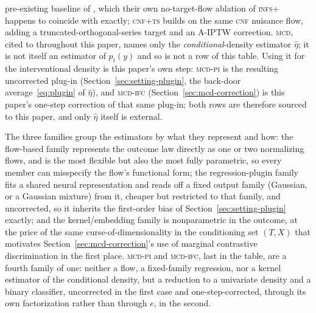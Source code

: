 \documentclass[11pt]{article}
\theoremstyle{plain}
\theoremstyle{definition}
\theoremstyle{remark}
\newcommand{\gps}{e}
\begin{document}
\begin{table}[htbp]
{pre-existing baseline of \citet{trippe2018cnf}, which their own no-target-flow ablation of
\textsc{infs+} happens to coincide with exactly; \textsc{cnf+ts} \citep{kennedy2023density}
builds on the same \textsc{cnf} nuisance flow, adding a truncated-orthogonal-series target and
an A-IPTW correction. \textsc{mcd}, cited to \citet{meziani2025mcd} throughout this paper,
names only the \emph{conditional}-density estimator $\widehat\eta$; it is not itself an
estimator of $p_t(y)$ and so is not a row of this table. Using it for the interventional
density is this paper's own step: \textsc{mcd-pi} is the resulting uncorrected plug-in
(Section~\ref{sec:setting-plugin}, the back-door average~\eqref{eq:plugin} of $\widehat\eta$),
and \textsc{mcd-ifc} (Section~\ref{sec:mcd-correction}) is this paper's one-step correction of
that same plug-in; both rows are therefore sourced to this paper, and only $\widehat\eta$
itself is external.}
\label{tab:glossary}
\end{table}

The three families group the estimators by what they represent and how: the flow-based family
represents the outcome law directly as one or two normalizing flows, and is the most flexible
but also the most fully parametric, so every member can misspecify the flow's functional form;
the regression-plugin family fits a shared neural representation and reads off a fixed output
family (Gaussian, or a Gaussian mixture) from it, cheaper but restricted to that family, and
uncorrected, so it inherits the first-order bias of Section~\ref{sec:setting-plugin} exactly;
and the kernel/embedding family is nonparametric in the outcome, at the price of the same
curse-of-dimensionality in the conditioning set $(T,X)$ that motivates
Section~\ref{sec:mcd-correction}'s use of marginal contrastive discrimination in the first
place. \textsc{mcd-pi} and \textsc{mcd-ifc}, last in the table, are a fourth family of one:
neither a flow, a fixed-family regression, nor a kernel estimator of the conditional density,
but a reduction to a univariate density and a binary classifier, uncorrected in the first case
and one-step-corrected, through its own factorization rather than through $\gps$, in the
second.
\end{document}
